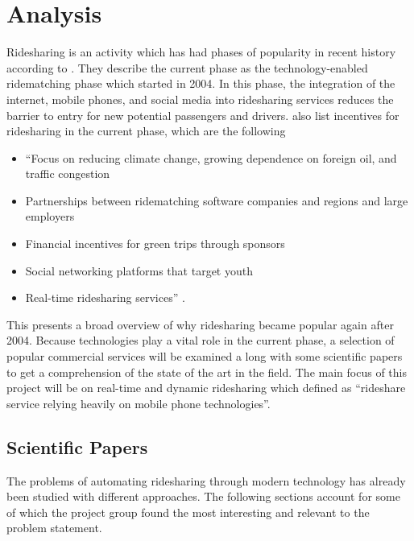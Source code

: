 \section{Analysis}
Ridesharing is an activity which has had phases of popularity in recent history according to \citet{doi:10.1080/01441647.2011.621557}.
They describe the current phase as the technology-enabled ridematching phase which started in 2004.
In this phase, the integration of the internet, mobile phones, and social media into ridesharing services reduces the barrier to entry for new potential passengers and drivers.
\citet{doi:10.1080/01441647.2011.621557} also list incentives for ridesharing in the current phase, which are the following 

\begin{itemize}
  \item ``Focus on reducing climate change, growing dependence on foreign oil, and traffic congestion
  \item Partnerships between ridematching software companies and regions and large employers
  \item Financial incentives for green trips through sponsors
  \item Social networking platforms that target youth
  \item Real-time ridesharing services'' \citep{doi:10.1080/01441647.2011.621557}.
\end{itemize}

This presents a broad overview of why ridesharing became popular again after 2004.
Because technologies play a vital role in the current phase, a selection of popular commercial services will be examined a long with some scientific papers to get a comprehension of the state of the art in the field.
The main focus of this project will be on real-time and dynamic ridesharing which \citet{amey2011real} defined as ``rideshare service relying heavily on mobile phone technologies''.

\subsection{Scientific Papers}
The problems of automating ridesharing through modern technology has already been studied with different approaches.
The following sections account for some of which the project group found the most interesting and relevant to the problem statement. 

